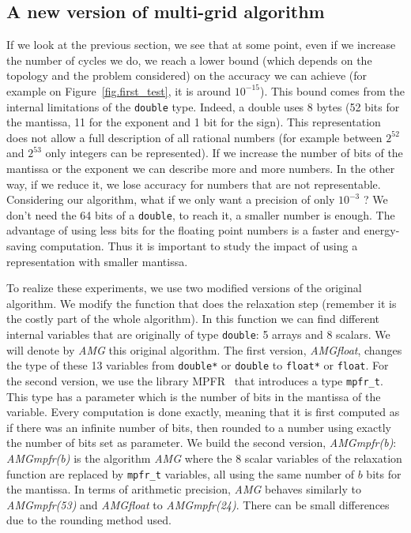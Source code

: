    \subsection{A new version of multi-grid algorithm}
   If we look at the previous section, we see that at some point, even if we increase the number of cycles we do, we reach a lower bound (which depends on the topology and the problem considered) on the accuracy we can achieve (for example on Figure~\ref{fig.first_test}, it is around $10^{-15}$). This bound comes from the internal limitations of the \texttt{double} type.
   Indeed, a double uses 8 bytes (52 bits for the mantissa, 11 for the exponent and 1 bit for the sign). This representation does not allow a full description of all rational numbers (for example between $2^{52}$ and $2^{53}$ only integers can be represented).
   If we increase the number of bits of the mantissa or the exponent we can describe more and more numbers. In the other way, if we reduce it, we lose accuracy for numbers that are not representable. Considering our algorithm, what if we only want
   a precision of only $10^{-3}$ ? We don't need the 64 bits of a \texttt{double}, to reach it, a smaller number is enough. The advantage of using less bits for the floating point numbers is a faster and energy-saving computation. Thus it is important
   to study the impact of using a representation with smaller mantissa.
   
   To realize these experiments, we use two modified versions of the original algorithm. We modify the function that does the relaxation step (remember it is the costly part of the whole algorithm).
   In this function we can find different internal variables that are originally of type \texttt{double}: 5 arrays and 8 scalars. We will denote by \emph{AMG} this original algorithm. The first version, \emph{AMGfloat}, changes the type of these 13 variables from \texttt{double*} or \texttt{double}
   to \texttt{float*} or \texttt{float}. For the second version, we use the library MPFR~\cite{MPFR,MPFR_link} that introduces a type \texttt{mpfr\_t}. This type has a parameter which is the number of bits in the mantissa of the variable.
   Every computation is done exactly, meaning that it is first computed as if there was an infinite number of bits, then rounded to a number using exactly the number of bits set as parameter. We build the second version, \emph{AMGmpfr(b)}: \emph{AMGmpfr(b)} is the algorithm \emph{AMG} where the 8 scalar variables of the relaxation function are replaced
   by \texttt{mpfr\_t} variables, all using the same number of $b$ bits for the mantissa. In terms of arithmetic precision, \emph{AMG} behaves similarly to \emph{AMGmpfr(53)} and \emph{AMGfloat} to \emph{AMGmpfr(24)}. There can be small differences
   due to the rounding method used.
   

